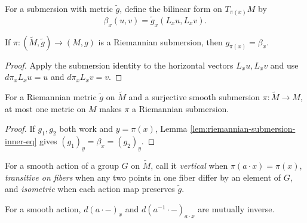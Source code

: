 \begin{definition}
\label{def:submersion-inner}
\leanok
{}
For a submersion with metric $\tilde g$, define the bilinear form on $T_{\pi(x)}M$ by
\[
\beta_x(u,v)=\tilde g_x(L_xu,L_xv).
\]
\end{definition}

\begin{lemma}
\label{lem:riemannian-submersion-inner-eq}
\leanok
{}
If $\pi:(\tilde M,\tilde g)\to(M,g)$ is a Riemannian submersion, then $g_{\pi(x)}=\beta_x$.
\end{lemma}

\begin{proof}
\leanok
{}
\sketch Apply the submersion identity to the horizontal vectors $L_xu,L_xv$ and use $d\pi_xL_xu=u$ and $d\pi_xL_xv=v$.
\end{proof}

\begin{proposition}
\label{prop:riemannian-submersion-metric-unique}
\leanok
{}
For a Riemannian metric $\tilde g$ on $\tilde M$ and a surjective smooth submersion $\pi:\tilde M\to M$, at most one metric on $M$ makes $\pi$ a Riemannian submersion.
\end{proposition}

\begin{proof}
\leanok
{}
\sketch If $g_1,g_2$ both work and $y=\pi(x)$, Lemma \ref{lem:riemannian-submersion-inner-eq} gives $(g_1)_y=\beta_x=(g_2)_y$.
\end{proof}

For a smooth action of a group $G$ on $\tilde M$, call it \emph{vertical} when $\pi(a\cdot x)=\pi(x)$, \emph{transitive on fibers} when any two points in one fiber differ by an element of $G$, and \emph{isometric} when each action map preserves $\tilde g$.

\begin{lemma}
\label{lem:mfderiv-smul-inv-smul}
\leanok
{}
For a smooth action, $d(a\cdot {-})_x$ and $d(a^{-1}\cdot {-})_{a\cdot x}$ are mutually inverse.
\end{lemma}

